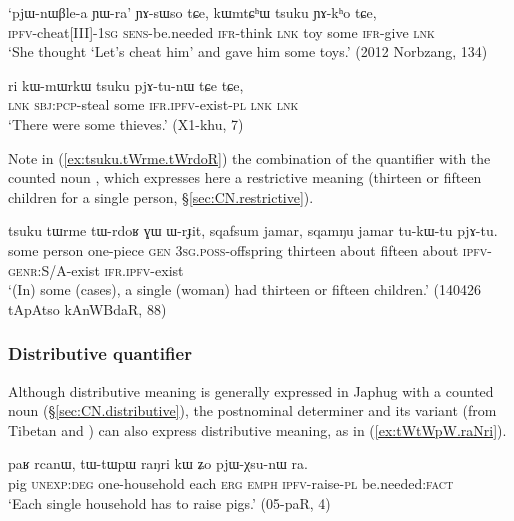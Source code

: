\begin{exe}
\ex \label{ex:kWmtChW.tsuku}
\gll  `pjɯ-nɯβle-a ɲɯ-ra' ɲɤ-sɯso tɕe, kɯmtɕʰɯ tsuku ɲɤ-kʰo tɕe, \\
\textsc{ipfv}-cheat[III]-\textsc{1sg} \textsc{sens}-be.needed \textsc{ifr}-think \textsc{lnk} toy some \textsc{ifr}-give \textsc{lnk} \\
\glt `She thought `Let's cheat him' and gave him some toys.' (2012 Norbzang, 134)
\end{exe}

\begin{exe}
\ex \label{ex:kWmWrkW.tsuku}
\gll ri kɯ-mɯrkɯ tsuku pjɤ-tu-nɯ tɕe tɕe, \\
\textsc{lnk} \textsc{sbj}:\textsc{pcp}-steal some \textsc{ifr}.\textsc{ipfv}-exist-\textsc{pl} \textsc{lnk} \textsc{lnk} \\
\glt `There were some thieves.' (X1-khu, 7)
\end{exe}

Note in (\ref{ex:tsuku.tWrme.tWrdoR}) the combination of the quantifier  with the counted noun , which expresses here a restrictive meaning (thirteen or fifteen children for a single person, §\ref{sec:CN.restrictive}).

\begin{exe}
\ex \label{ex:tsuku.tWrme.tWrdoR}
\gll tsuku tɯrme tɯ-rdoʁ ɣɯ ɯ-rɟit, sqafsum jamar, sqamŋu jamar tu-kɯ-tu pjɤ-tu. \\
 some person one-piece \textsc{gen} \textsc{3sg}.\textsc{poss}-offspring thirteen about fifteen about \textsc{ipfv}-\textsc{genr}:S/A-exist \textsc{ifr}.\textsc{ipfv}-exist    \\
\glt  `(In) some (cases), a single (woman) had thirteen or fifteen children.' (140426 tApAtso kAnWBdaR, 88)
\end{exe}
 
\subsubsection{Distributive quantifier} \label{sec:raNri}
 Although distributive meaning is generally expressed in Japhug with a counted noun (§\ref{sec:CN.distributive}), the postnominal determiner  and its variant  (from Tibetan  and ) can also express distributive meaning, as in (\ref{ex:tWtWpW.raNri}). 
 
\begin{exe}
\ex \label{ex:tWtWpW.raNri}
\gll paʁ rcanɯ, tɯ-tɯpɯ raŋri kɯ ʑo pjɯ-χsu-nɯ ra.\\
pig \textsc{unexp}:\textsc{deg} one-household each \textsc{erg} \textsc{emph} \textsc{ipfv}-raise-\textsc{pl} be.needed:\textsc{fact}\\
\glt `Each single household has to raise pigs.' (05-paR, 4)
 \end{exe}
 
